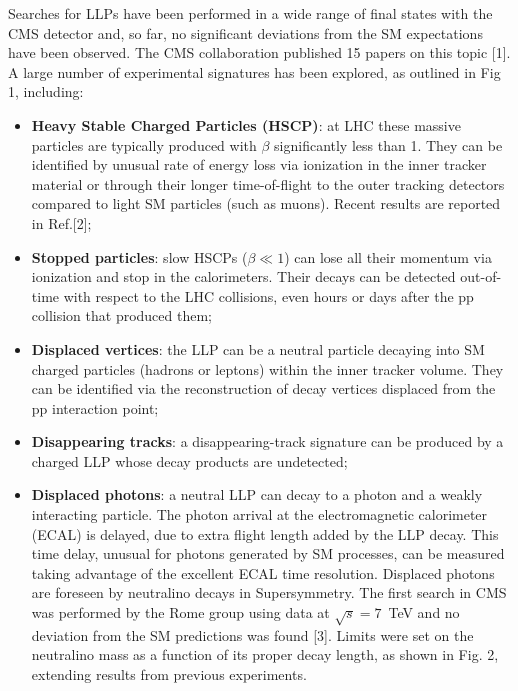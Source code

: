 \documentclass[twocolumn,twoside,10pt,nodate]{article}
\begin{document}
Searches for LLPs have been performed in a
wide range of final states with the CMS detector 
and, so far, no significant deviations from the SM
expectations have been observed. The CMS collaboration published 
15 papers on this topic [1]. A large number of experimental 
signatures has been explored, as outlined in Fig 1, including:
\begin{itemize}
\item {\bf Heavy Stable Charged Particles (HSCP)}: at LHC these massive 
particles are typically produced with $\beta$ significantly less than
1. They can be
identified by unusual rate of energy loss via ionization in the inner
tracker material or through their 
longer time-of-flight to the outer tracking detectors
compared to light SM particles (such as muons). 
Recent results are reported in Ref.[2];
\item {\bf Stopped particles}: slow HSCPs ($\beta \ll 1$) can lose all 
their momentum via ionization and stop in the calorimeters. 
  Their decays can be detected out-of-time with respect to the
  LHC collisions, even hours or days after the pp collision that produced
  them;
\item {\bf Displaced vertices}: the LLP can be a neutral particle
  decaying into SM charged particles (hadrons or leptons) within the
  inner tracker volume. They can be identified via the reconstruction
  of decay vertices displaced from the pp interaction point;
\item {\bf Disappearing tracks}: a disappearing-track signature can be produced by a
  charged LLP whose decay products are undetected;
\item {\bf Displaced photons}: a neutral LLP can decay to a photon and a weakly
  interacting particle. 
The photon arrival at
  the electromagnetic calorimeter (ECAL) is delayed, due to extra flight
  length added by the LLP decay. This time delay, unusual for photons
  generated by SM processes, can be measured taking advantage of the
  excellent ECAL time resolution. Displaced photons are foreseen by
  neutralino decays in Supersymmetry. 
The first search in CMS was performed by the Rome group using data at
$\sqrt{s}=7$~TeV and no deviation from the SM predictions was found [3].
Limits were set on the neutralino mass as a function of its proper
decay length, as shown in Fig. 2, extending results from previous experiments.
\end{itemize}
\end{document}
